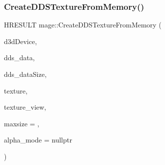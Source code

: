 \subsubsection{\texorpdfstring{Create\+D\+D\+S\+Texture\+From\+Memory()}{CreateDDSTextureFromMemory()}\hspace{0.1cm}{\footnotesize\ttfamily [1/4]}}
{\footnotesize\ttfamily H\+R\+E\+S\+U\+LT mage\+::\+Create\+D\+D\+S\+Texture\+From\+Memory (\begin{DoxyParamCaption}\item[{\+\_\+\+In\+\_\+ I\+D3\+D11\+Device $\ast$}]{d3d\+Device,  }\item[{\+\_\+\+In\+\_\+reads\+\_\+bytes\+\_\+(dds\+\_\+data\+Size) const uint8\+\_\+t $\ast$}]{dds\+\_\+data,  }\item[{\+\_\+\+In\+\_\+ size\+\_\+t}]{dds\+\_\+data\+Size,  }\item[{\+\_\+\+Outptr\+\_\+opt\+\_\+ I\+D3\+D11\+Resource $\ast$$\ast$}]{texture,  }\item[{\+\_\+\+Outptr\+\_\+opt\+\_\+ I\+D3\+D11\+Shader\+Resource\+View $\ast$$\ast$}]{texture\+\_\+view,  }\item[{\+\_\+\+In\+\_\+ size\+\_\+t}]{maxsize = {},  }\item[{\+\_\+\+Out\+\_\+opt\+\_\+ \hyperlink{namespacemage_a0c586a2bad862f4858900ca121ca80c2}{D\+D\+S\+\_\+\+A\+L\+P\+H\+A\+\_\+\+M\+O\+DE} $\ast$}]{alpha\+\_\+mode = {\ttfamily nullptr} }\end{DoxyParamCaption})}

\hypertarget{namespacemage_a9005e298930545563b03a7fa18af9eb6}{}\label{namespacemage_a9005e298930545563b03a7fa18af9eb6} 
